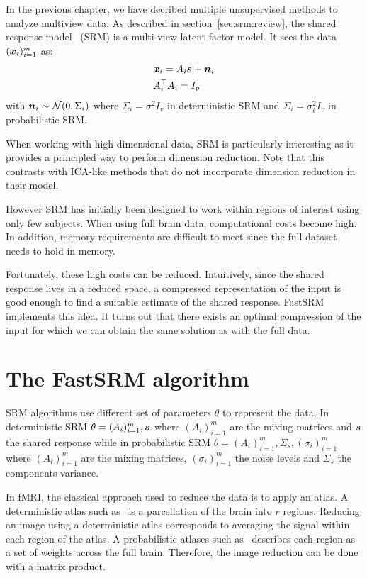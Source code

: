 In the previous chapter, we have decribed multiple unsupervised methods to analyze
multiview data.
As described in section~\ref{sec:srm:review}, the shared response
model~\cite{chen2015reduced} (SRM) is a multi-view latent factor model. It sees
the data $(\boldsymbol{x}_i)_{i=1}^m$ as:
\begin{align}
  &\boldsymbol{x}_i = A_i \boldsymbol{s} + \boldsymbol{n}_i \\
  &A_i^{\top}A_i = I_p
    \label{eq:model:srm}
\end{align}
with $\boldsymbol{n}_i \sim \mathcal{N}(0, \Sigma_i)$ where $\Sigma_i = \sigma^2 I_v$ in
deterministic SRM and $\Sigma_i = \sigma_i^2 I_v$ in probabilistic SRM.

When working with high dimensional data, SRM is particularly
interesting as it provides a principled way to perform dimension reduction. Note that this
contrasts with ICA-like methods that do not incorporate dimension reduction in their model.

However SRM has initially been designed to work within regions of interest using
only few subjects. When using full brain data, computational costs become
high. In addition, memory requirements are difficult to meet since the full dataset needs to hold
in memory.

Fortunately, these high costs can be reduced. Intuitively, since the shared
response lives in a reduced space, a compressed representation of the input is
good enough to find a suitable estimate of the shared response.
FastSRM implements this idea. It turns out that there exists an optimal
compression of the input for which we can obtain the same solution as
with the full data.

\section{The FastSRM algorithm}
SRM algorithms use different set of parameters $\theta$ to represent the data.
In deterministic SRM $\theta = (A_i)_{i=1}^m, \boldsymbol{s}$ where $(A_i)_{i=1}^m$ are the
mixing matrices and $\boldsymbol{s}$ the shared response while in probabilistic SRM $\theta
= (A_i)_{i=1}^m, \Sigma_s, (\sigma_i)_{i=1}^m$ where $(A_i)_{i=1}^m$ are the
mixing matrices, $(\sigma_i)_{i=1}^m$ the noise levels and $\Sigma_s$ the
components variance.

In fMRI, the classical approach used to reduce the data is to apply an atlas.
A deterministic atlas such as~\cite{bellec2010multi} is a parcellation of the
brain into $r$ regions. Reducing an image using a deterministic atlas corresponds to
averaging the signal within each region of the atlas. A probabilistic atlases such
as~\cite{dadi_fine-grain_2020} describes each region as a set of weights across
the full brain. Therefore, the image reduction can be done with a matrix product.

